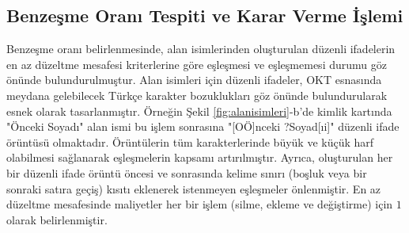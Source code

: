 \documentclass[conference, a4paper]{IEEEtran}
\begin{document}
\subsection{Benzeşme Oranı Tespiti ve Karar Verme İşlemi}
Benzeşme oranı belirlenmesinde, alan isimlerinden oluşturulan düzenli ifadelerin en az düzeltme mesafesi kriterlerine
göre eşleşmesi ve eşleşmemesi durumu göz önünde bulundurulmuştur. Alan isimleri için düzenli ifadeler, OKT esnasında
meydana gelebilecek Türkçe karakter bozuklukları göz önünde bulundurularak esnek olarak tasarlanmıştır. Örneğin Şekil
\ref{fig:alanisimleri}-b'de kimlik kartında "Önceki Soyadı" alan ismi bu işlem sonrasına "[OÖ]nceki ?Soyad[ıi]" düzenli
ifade örüntüsü olmaktadır. Örüntülerin tüm karakterlerinde büyük ve küçük harf olabilmesi sağlanarak eşleşmelerin
kapsamı artırılmıştır. Ayrıca, oluşturulan her bir düzenli ifade örüntü öncesi ve sonrasında kelime sınırı (boşluk veya
bir sonraki satıra geçiş) kısıtı eklenerek istenmeyen eşleşmeler önlenmiştir. En az düzeltme mesafesinde maliyetler her
bir işlem (silme, ekleme ve değiştirme) için $1$ olarak belirlenmiştir.
\end{document}
